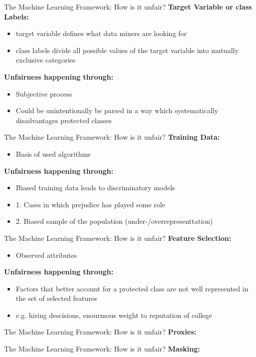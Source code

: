 \begin{frame}{The Machine Learning Framework: How is it unfair? \cite{Barocas.2016}}
    \textbf{Target Variable or class Labels:} \\
    \begin{itemize}
        \item target variable defines what data miners are looking for
        \item class labels divide all possible values of the target variable into mutually exclusive categories
    \end{itemize}
    \begin{block}{\textbf{Unfairness happening through:}}
    \begin{itemize}
        \item Subjective process
        \item Could be unintentionally be parsed in a way which systematically disadvantages protected classes
    \end{itemize}
        \end{block}
\end{frame}

\begin{frame}{The Machine Learning Framework: How is it unfair? \cite{Barocas.2016}}
    \textbf{Training Data:}
    \begin{itemize}
        \item Basis of used algorithms
    \end{itemize}
    \begin{block}{\textbf{Unfairness happening through:}}
    \begin{itemize}
        \item Biased training data leads to discriminatory models
        \item 1. Cases in which prejudice has played some role
        \item 2. Biased sample of the population (under-/overrepresenttation)
    \end{itemize}
        \end{block}
\end{frame}

\begin{frame}{The Machine Learning Framework: How is it unfair? \cite{Barocas.2016}}
    \textbf{Feature Selection:}
    \begin{itemize}
        \item Observed attributes
    \end{itemize}
    \begin{block}{\textbf{Unfairness happening through:}}
    \begin{itemize}
        \item Factors that better account for a protected class are not well represented in the set of selected features 
        \item e.g. hiring descisions, enourmous weight to reputation of college
    \end{itemize}
        \end{block}
\end{frame}

\begin{frame}{The Machine Learning Framework: How is it unfair? \cite{Barocas.2016}}
    \textbf{Proxies:}
\end{frame}

\begin{frame}{The Machine Learning Framework: How is it unfair? \cite{Barocas.2016}}
    \textbf{Masking:}
\end{frame}